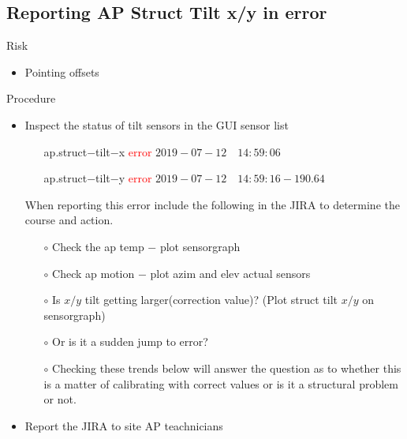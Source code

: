 \subsection{Reporting AP Struct Tilt x/y  in error}
Risk
\begin{itemize}

\item{} Pointing offsets
\end{itemize}
Procedure 
\begin{itemize}
\item{} Inspect the status of tilt sensors in the GUI sensor list  
\begin{itemize}

	\item[] ap.struct$-$tilt$-$x  	\textcolor{red} {error}  	$2019-07-12 \quad 14:59:06$
	\item[] ap.struct$-$tilt$-$y  	\textcolor{red} {error} $2019-07-12 \quad 14:59:16-190.64$
\end{itemize}



When reporting this error include the following in the JIRA to determine the course and action.
\begin{itemize}
	\item[$\circ$] Check the  ap temp $-$ plot sensorgraph
	\item[$\circ$] Check ap motion $-$ plot azim and elev actual sensors
	\item[$\circ$] Is $x/y$ tilt getting larger(correction value)? (Plot struct tilt $x/y$ on sensorgraph)
	\item[$\circ$] Or is it a sudden jump to error? 
	\item[$\circ$] Checking these trends below will answer the question as to whether this is a matter of calibrating with correct values or is it a structural problem or not.
	
	
	
	
\end{itemize}
\item{} Report the JIRA to site AP teachnicians
\end{itemize}